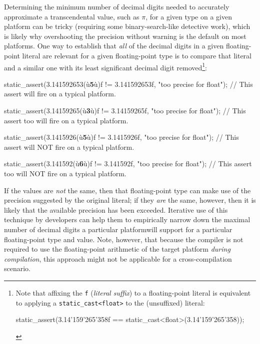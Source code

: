 Determining the minimum number of decimal digits needed to accurately
approximate a transcendental value, such as $\pi$, for a given type on
a given platform can be tricky (requiring some binary-search-like
detective work), which is likely why overshooting the precision without
warning is the default on most platforms. One way to establish that
\emph{all} of the decimal digits in a given floating-point literal are
relevant for a given floating-point type is to compare that literal and
a similar one with its least significant decimal digit
removed{\cprotect\footnote{Note that affixing the \lstinline!f!
(\emph{literal suffix}) to a floating-point literal is
equivalent to applying a \lstinline!static_cast<float>! to the
(unsuffixed) literal:

\begin{emcppslisting}[emcppsstandards={c++14}, basicstyle={\ttfamily\footnotesize}]
static_assert(3.14'159'265'358f == static_cast<float>(3.14'159'265'358));
\end{emcppslisting}\vspace*{-1ex}
      }}:

\begin{emcppslisting}[emcppsignore={Bold numbers prevent assertions from not compiling properly}]
static_assert(3.141592653(ù{\bfseries 5}ù)f != 3.141592653f, "too precise for float");
    // This assert will fire on a typical platform.

static_assert(3.14159265(ù{\bfseries 3}ù)f != 3.14159265f, "too precise for float");
    // This assert too will fire on a typical platform.

static_assert(3.1415926(ù{\bfseries 5}ù)f != 3.1415926f, "too precise for float");
    // This assert will NOT fire on a typical platform.

static_assert(3.141592(ù{\bfseries 6}ù)f != 3.141592f, "too precise for float");
    // This assert too will NOT fire on a typical platform.
\end{emcppslisting}

\noindent If the values are \emph{not} the same, then that floating-point type
can make use of the precision suggested by the original literal; if
they \emph{are} the same, however, then it is likely that the available
precision has been exceeded. Iterative use of this technique by
developers can help them to empirically narrow down the maximal number
of decimal digits a particular platform\linebreak[4]  
\newpage will support for a particular
floating-point type and value. Note, however, that because the compiler is not required to use the floating-point arithmetic of the target platform \emph{during compilation}, this approach might not be applicable for a cross-compilation scenario.


